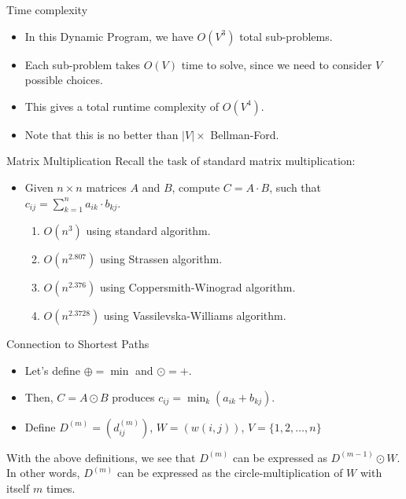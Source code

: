 \documentclass{beamer}
\begin{document}
\begin{frame}{Time complexity}
    \begin{itemize}
        \item In this Dynamic Program, we have $O(V^3)$ total sub-problems.
        \item Each sub-problem takes $O(V)$ time to solve, since we need to consider $V$ possible choices.
        \item This gives a total runtime complexity of $O(V^4)$.
        \item Note that this is no better than $|V| \times$ Bellman-Ford.
    \end{itemize}
\end{frame}

\begin{frame}{Matrix Multiplication}
    Recall the task of standard matrix multiplication:
    \begin{itemize}
        \item Given $n \times n$ matrices $A$ and $B$, compute $C = A \cdot B$, such that $c_{ij} = \sum_{k=1}^{n} a_{ik} \cdot b_{kj}$. \pause
        \begin{enumerate}
            \item $O(n^3)$ using standard algorithm. \pause
            \item $O(n^{2.807})$  using Strassen algorithm. \pause
            \item $O(n^{2.376})$  using Coppersmith-Winograd algorithm. \pause
            \item $O(n^{2.3728})$ using Vassilevska-Williams algorithm.
        \end{enumerate}
    \end{itemize}
\end{frame}

\begin{frame}{Connection to Shortest Paths}
    \begin{itemize}
        \item Let's define $\oplus = \min$ and $\odot = +$.
        \item Then, $C = A \odot B$ produces $c_{ij} = \min_k (a_{ik} + b_{kj})$.
        \item Define $D^{(m)} = (d_{ij}^{(m)})$, $W = (w(i, j))$, $V = \{1,2, \ldots, n\}$
    \end{itemize}
    \bigskip
    With the above deﬁnitions, we see that $D^{(m)}$ can be expressed as $D^{(m-1)} \odot W$. In other words, $D^{(m)}$ can be expressed as the circle-multiplication of $W$ with itself $m$ times.
\end{frame}
\end{document}
